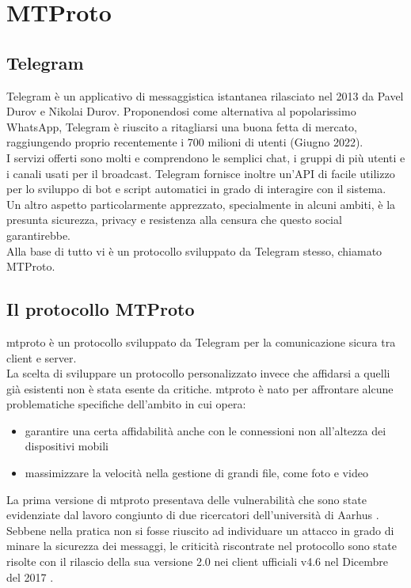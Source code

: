 \section{MTProto}

\subsection{Telegram}
Telegram è un applicativo di messaggistica istantanea rilasciato nel 2013 da Pavel Durov e Nikolai Durov.
Proponendosi come alternativa al popolarissimo WhatsApp, Telegram è riuscito a ritagliarsi una buona fetta di mercato,
raggiungendo proprio recentemente i 700 milioni di utenti (Giugno 2022). \\
I servizi offerti sono molti e comprendono le semplici chat, i gruppi di più utenti e i canali usati per il broadcast.
Telegram fornisce inoltre un'API di facile utilizzo per lo sviluppo di bot e script automatici in grado di interagire
con il sistema. \\

Un altro aspetto particolarmente apprezzato, specialmente in alcuni ambiti, è la presunta sicurezza, privacy
e resistenza alla censura che questo social garantirebbe. \\
Alla base di tutto vi è un protocollo sviluppato da Telegram stesso, chiamato MTProto.

\subsection{Il protocollo MTProto}
\gls{mtproto} è un protocollo sviluppato da Telegram per la comunicazione sicura tra client e server. \\
La scelta di sviluppare un protocollo personalizzato invece che affidarsi a quelli già esistenti non è stata esente da critiche.
\gls{mtproto} è nato per affrontare alcune problematiche specifiche dell'ambito in cui opera:
\begin{itemize}
    \item garantire una certa affidabilità anche con le connessioni non all'altezza dei dispositivi mobili
    \item massimizzare la velocità nella gestione di grandi file, come foto e video
\end{itemize}

La prima versione di \gls{mtproto} presentava delle vulnerabilità che sono state evidenziate dal lavoro congiunto di due ricercatori dell'università di Aarhus \cite{inp:mtproto-v1-attacks}.
Sebbene nella pratica non si fosse riuscito ad individuare un attacco in grado di minare la sicurezza dei messaggi,
le criticità riscontrate nel protocollo sono state risolte con il rilascio della sua versione 2.0 nei client ufficiali v4.6 nel Dicembre del 2017 \cite{man:mtproto}. \\

